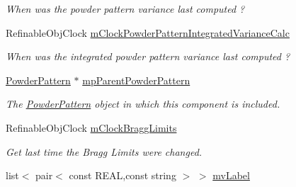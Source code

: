 \begin{DoxyCompactItemize}
\begin{DoxyCompactList}\small\item\em When was the powder pattern variance last computed ? \end{DoxyCompactList}\item 
\mbox{\label{class_obj_cryst_1_1_powder_pattern_component_a4f1cc991dadf2cecfbd758c91b9cbd78}} 
Refinable\+Obj\+Clock \mbox{\hyperlink{class_obj_cryst_1_1_powder_pattern_component_a4f1cc991dadf2cecfbd758c91b9cbd78}{m\+Clock\+Powder\+Pattern\+Integrated\+Variance\+Calc}}
\begin{DoxyCompactList}\small\item\em When was the \textquotesingle{}integrated\textquotesingle{} powder pattern variance last computed ? \end{DoxyCompactList}\item 
\mbox{\label{class_obj_cryst_1_1_powder_pattern_component_ad565327e0f1e6af053d0766c39ced8a0}} 
\mbox{\hyperlink{class_obj_cryst_1_1_powder_pattern}{Powder\+Pattern}} $\ast$ \mbox{\hyperlink{class_obj_cryst_1_1_powder_pattern_component_ad565327e0f1e6af053d0766c39ced8a0}{mp\+Parent\+Powder\+Pattern}}
\begin{DoxyCompactList}\small\item\em The \mbox{\hyperlink{class_obj_cryst_1_1_powder_pattern}{Powder\+Pattern}} object in which this component is included. \end{DoxyCompactList}\item 
\mbox{\label{class_obj_cryst_1_1_powder_pattern_component_a7320d473c830fda04684c01a9cd1f5cb}} 
Refinable\+Obj\+Clock \mbox{\hyperlink{class_obj_cryst_1_1_powder_pattern_component_a7320d473c830fda04684c01a9cd1f5cb}{m\+Clock\+Bragg\+Limits}}
\begin{DoxyCompactList}\small\item\em Get last time the Bragg Limits were changed. \end{DoxyCompactList}\item 
\mbox{\label{class_obj_cryst_1_1_powder_pattern_component_abe173118c67113339887a9831ad3a10f}} 
list$<$ pair$<$ const R\+E\+AL,const string $>$ $>$ \mbox{\hyperlink{class_obj_cryst_1_1_powder_pattern_component_abe173118c67113339887a9831ad3a10f}{mv\+Label}}

\end{DoxyCompactItemize}
